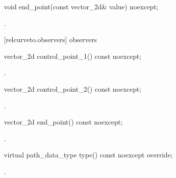 \begin{itemdecl}
    void end_point(const vector_2d& value) noexcept;
\end{itemdecl}
\begin{itemdescr}
	\pnum
	\postconditions
	.
	
\end{itemdescr}

 [relcurveto.observers]{ observers}

\begin{itemdecl}
    vector_2d control_point_1() const noexcept;
\end{itemdecl}
\begin{itemdescr}
	\pnum
	\returns
	.

\end{itemdescr}

\begin{itemdecl}
    vector_2d control_point_2() const noexcept;
\end{itemdecl}
\begin{itemdescr}
	\pnum
	\returns
	.

\end{itemdescr}

\begin{itemdecl}
    vector_2d end_point() const noexcept;
\end{itemdecl}
\begin{itemdescr}
	\pnum
	\returns
	.

\end{itemdescr}

\begin{itemdecl}
    virtual path_data_type type() const noexcept override;
\end{itemdecl}
\begin{itemdescr}
	\pnum
	\returns
	.

\end{itemdescr}
